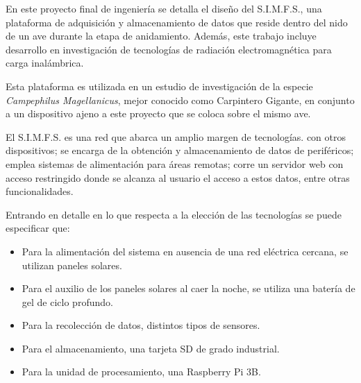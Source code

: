 En este proyecto final de ingeniería se detalla el diseño del S.I.M.F.S., una plataforma de adquisición y almacenamiento de datos que reside dentro del nido de un ave durante la etapa de anidamiento. Además, este trabajo incluye desarrollo en investigación de tecnologías de radiación electromagnética para carga inalámbrica.

Esta plataforma es utilizada en un estudio de investigación de la especie \textit{Campephilus Magellanicus}, mejor conocido como Carpintero Gigante, en conjunto a un dispositivo ajeno a este proyecto que se coloca sobre el mismo ave.

El S.I.M.F.S. es una red que abarca un amplio margen de tecnologías.  con otros dispositivos; se encarga de la obtención y almacenamiento de datos de periféricos; emplea sistemas de alimentación para áreas remotas; corre un servidor web con acceso restringido donde se alcanza al usuario el acceso a estos datos, entre otras funcionalidades.


Entrando en detalle en lo que respecta a la elección de las tecnologías se puede especificar que:
\begin{itemize}
	\item Para la alimentación del sistema en ausencia de una red eléctrica cercana, se utilizan paneles solares.
	\item Para el auxilio de los paneles solares al caer la noche, se utiliza una batería de gel de ciclo profundo.
	\item Para la recolección de datos, distintos tipos de sensores.
	\item Para el almacenamiento, una tarjeta SD de grado industrial.
	\item Para la unidad de procesamiento, una Raspberry Pi 3B.
\end{itemize}


